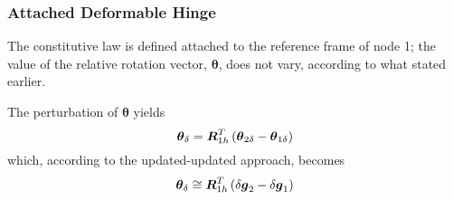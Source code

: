 \documentclass[10pt,dvips,fleqn]{report}
\newcommand{\T}[1]{\boldsymbol{#1}}
\begin{document}
\subsubsection{Attached Deformable Hinge}
The constitutive law is defined attached to the reference frame of node 1;
the value of the relative rotation vector, $\T{\theta}$, does not vary,
according to what stated earlier.

The perturbation of $\T{\theta}$ yields
\begin{equation}
	\T{\theta}_{\delta} = \T{R}_{1h}^T\plbr{\T{\theta}_{2\delta} - \T{\theta}_{1\delta}}
\end{equation}
which, according to the updated-updated approach, becomes
\begin{equation}
	\T{\theta}_{\delta} \cong \T{R}_{1h}^T\plbr{\delta\T{g}_2 - \delta\T{g}_1}
\end{equation}
\end{document}
